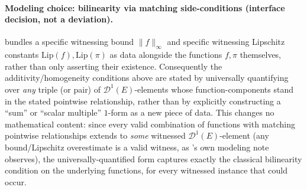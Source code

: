 \begin{definition}
  \paragraph{Modeling choice: bilinearity via matching side-conditions (interface decision, not a
  deviation).}  bundles a specific witnessing bound $\|f\|_\infty$ and specific
  witnessing Lipschitz constants $\mathrm{Lip}(f),\mathrm{Lip}(\pi)$ as data alongside the
  functions $f,\pi$ themselves, rather than only asserting their existence. Consequently the
  additivity/homogeneity conditions above are stated by universally quantifying over
  \emph{any} triple (or pair) of $\mathcal{D}^1(E)$-elements whose function-components stand in
  the stated pointwise relationship, rather than by explicitly constructing a ``sum'' or
  ``scalar multiple'' $1$-form as a new piece of data. This changes no mathematical content: since
  every valid combination of functions with matching pointwise relationships extends to \emph{some}
  witnessed $\mathcal{D}^1(E)$-element (any bound/Lipschitz overestimate is a valid witness, as
  's own modeling note observes), the universally-quantified form captures exactly
  the classical bilinearity condition on the underlying functions, for every witnessed instance
  that could occur.
\end{definition}
